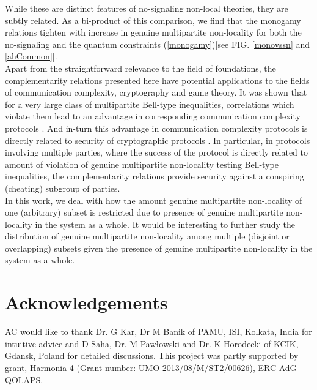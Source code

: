 \documentclass[%
 reprint,
 amsmath,amssymb,
 aps,
]{revtex4-1}
\theoremstyle{plain}
\begin{document}
While these are distinct features of no-signaling non-local theories, they are subtly related. As a bi-product of this comparison, we find that the monogamy relations tighten with increase in genuine multipartite non-locality for both the no-signaling and the quantum constraints (\ref{monogamy})[see FIG. \ref{monovssn} and \ref{ahCommon}]. \\
Apart from the straightforward relevance to the field of foundations, the complementarity relations presented here have potential applications to the fields of communication complexity, cryptography and game theory. It was shown that for a very large class of multipartite Bell-type inequalities, correlations which violate them lead to an advantage in corresponding communication complexity protocols \cite{brukner2004bell}. And in-turn this advantage in communication complexity protocols is directly related to security of cryptographic protocols \cite{becker1998communication,micciancio2004optimal,guedes2011quantum}. In particular, in protocols involving multiple parties, where the success of the protocol is directly related to amount of violation of genuine multipartite non-locality testing Bell-type inequalities, the complementarity relations provide security against a conspiring (cheating) subgroup of parties. \\
In this work, we deal with how the amount genuine multipartite non-locality of one (arbitrary) subset is restricted due to presence of genuine multipartite non-locality in the system as a whole. It would be interesting to further study the distribution of genuine multipartite non-locality among multiple (disjoint or overlapping) subsets given the presence of genuine multipartite non-locality in the system as a whole.
\section{Acknowledgements}
\noindent AC would like to thank Dr. G Kar, Dr M Banik of PAMU, ISI, Kolkata, India for intuitive advice and D Saha, Dr. M Pawłowski and Dr. K Horodecki of KCIK, Gdansk, Poland for detailed discussions. This project was partly supported by grant, Harmonia 4 (Grant number: UMO-2013/08/M/ST2/00626), ERC AdG QOLAPS.



\clearpage

\end{document}
